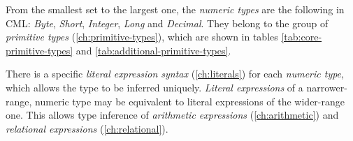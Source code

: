 From the smallest set to the largest one,
the \emph{numeric types} are the following in CML:
\emph{Byte}, \emph{Short}, \emph{Integer}, \emph{Long} and \emph{Decimal}.
They belong to the group of \emph{primitive types} (\ref{ch:primitive-types}),
which are shown in tables \ref{tab:core-primitive-types} and \ref{tab:additional-primitive-types}.

There is a specific \emph{literal expression syntax} (\ref{ch:literals})
for each \emph{numeric type},
which allows the type to be inferred uniquely.
\emph{Literal expressions} of a narrower-range, numeric type may be equivalent
to literal expressions of the wider-range one.
This allows type inference of \emph{arithmetic expressions} (\ref{ch:arithmetic})
and \emph{relational expressions} (\ref{ch:relational}).
